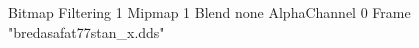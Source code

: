 {Bitmap
	{Filtering 1}
	{Mipmap 1}
	{Blend none}
	{AlphaChannel 0}
	{Frame "bredasafat77stan_x.dds"}
}
